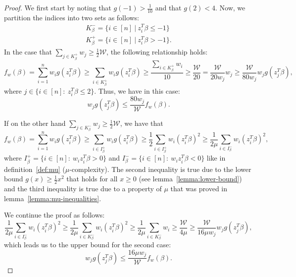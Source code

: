 \begin{proof}
    We first start by noting that $g(-1) > \frac{1}{10}$
    and that $g(2) < 4$. Now, we partition the indices into
    two sets as follows:
    \begin{gather*}
        K_\beta^- = \{ i \in [n] \ | \ z_i^T \beta \leq -1 \} \\
        K_\beta^+ = \{ i \in [n] \ | \ z_i^T \beta > -1 \}.
    \end{gather*}
    In the case that
    $\sum_{j \in K_\beta^+} w_j \geq \frac{1}{2} \mathcal{W}$, the following
    relationship holds:
    \begin{equation*}
        f_w(\beta) = \sum_{i=1}^n w_i g(z_i^T \beta)
        \geq \sum_{i \in K_\beta^+} w_i g(z_i^T \beta)
        \geq \frac{\sum_{i \in K_\beta^+} w_i}{10}
        \geq \frac{\mathcal{W}}{20}
        = \frac{\mathcal{W}}{20 w_j} w_j
        \geq \frac{\mathcal{W}}{80 w_j} w_j g(z_j^T \beta),
    \end{equation*}
    where $j \in \{i \in [n]:\ z_i^T \beta \leq 2 \}$.
    Thus, we have in this case:
    \begin{equation*}
        w_jg(z_j^T\beta) \leq \frac{80w_j}{\mathcal{W}} f_w(\beta).
    \end{equation*}

    \noindent If on the other hand
    $\sum_{j \in K_\beta^-} w_j \geq \frac{1}{2} \mathcal{W}$,
    we have that
    \begin{equation*}
        f_w(\beta)
        = \sum_{i=1}^n w_i g(z_i^T \beta)
        \geq \sum_{i \in I_\beta^+} w_i g(z_i^T \beta)
        \geq \frac{1}{2} \sum_{i \in I_\beta^+} w_i (z_i^T \beta)^2
        \geq \frac{1}{2\mu} \sum_{i \in I_\beta^-} w_i (z_i^T \beta)^2,
    \end{equation*}
    where $I_\beta^+ = \{i \in [n]:\ w_i z_i^T \beta > 0 \}$
    and $I_\beta^- = \{i \in [n]:\ w_i z_i^T \beta < 0 \}$ like in
    definition~\ref{def:mu} ($\mu$-complexity).
    The second inequality is true due to the lower bound
    $g(x) \geq \frac{1}{2} x^2$ that holds for all $x \geq 0$
    (see lemma~\ref{lemma:lower-bound}) and
    the third inequality is true due to a property of $\mu$ that
    was proved in lemma~\ref{lemma:mu-inequalities}.

    We continue the proof as follows:
    \begin{equation*}
        \frac{1}{2\mu} \sum_{i \in I_\beta^-} w_i (z_i^T \beta)^2
        \geq \frac{1}{2 \mu} \sum_{i \in K_\beta^-} w_i (z_i^T \beta)^2
        \geq \frac{1}{2 \mu} \sum_{i \in K_\beta^-} w_i
        \geq \frac{\mathcal{W}}{4 \mu}
        \geq \frac{\mathcal{W}}{16 \mu w_j} w_j g(z_j^T \beta),
    \end{equation*}
    which leads us to the upper bound for the second case:
    \begin{equation*}
        w_jg(z_j^T\beta) \leq \frac{16 \mu w_j}{\mathcal{W}} f_w(\beta).
    \end{equation*}


\end{proof}
